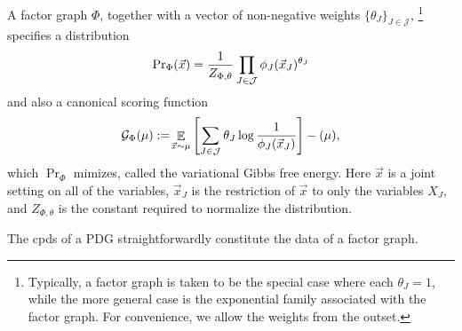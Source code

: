 \documentclass[letterpaper]{article} %
\theoremstyle{plain}
\theoremstyle{definition}
\theoremstyle{remark}
\let\H\relax
\DeclareMathOperator{\H}{\mathrm{H}} %
\DeclareMathOperator*{\E}{\mathbb{E}} %
\begin{document}
A factor graph $\Phi$,
together with a vector of non-negative weights $\{ \theta_J \}_{J \in \mathcal J}$,%
\footnote{
Typically, a factor graph is taken to be the special case
where each $\theta_J=1$,
 while the more general
case is the exponential family associated with the factor graph.
 For convenience, we allow the weights from the outset.}
specifies a distribution 
\[ {\Pr}_{\Phi}(\vec x)
		= \frac{1}{Z_{\Phi, \theta}} \prod_{J \in \cal J} \phi_J(\vec
                                x_J)^{\theta_J} \]
and also a canonical scoring function 
\[ \mathcal G_\Phi(\mu) := \!\E_{\vec x\sim\mu}\left[  \sum_{J \in
               \cal J} \theta_J \log\frac1{\phi_J(\vec
               x_J)}\right] - \H(\mu)  , \]
which $\Pr_\Phi$ mimizes, called the variational Gibbs free energy.
Here $\vec{x}$ is a joint setting on all of the variables,
        $\vec{x}_J$ is the restriction of $\vec{x}$ to only the
        variables $X_J$, and $Z_{\Phi, \theta}$ is the constant required to
        normalize the distribution.  

The cpds of a PDG straightforwardly constitute the data of a factor graph. 
\end{document}
